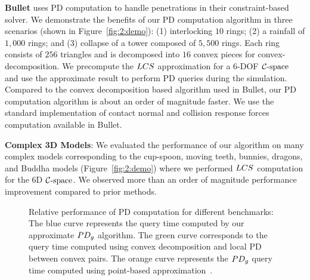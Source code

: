 \textbf{Bullet} uses PD computation to handle penetrations in their constraint-based solver.
We demonstrate the benefits of our PD computation algorithm in three scenarios (shown in Figure~\ref{fig:2:demo}):
(1) interlocking $10$ rings; (2) a rainfall of $1,000$ rings; and (3) collapse of a tower composed of $5,500$ rings.
Each ring consists of $256$ triangles and is decomposed into $16$ convex pieces for convex-decomposition.
We precompute the $LCS$ approximation for a 6-DOF $\mathcal C\text{-space}$ and use the approximate result to perform PD queries during the simulation.
Compared to the convex decomposition based algorithm used in Bullet, our PD computation algorithm is about
an order of magnitude faster. We use the standard implementation of contact normal and collision response forces computation available in Bullet.

\textbf{Complex 3D Models}:
We evaluated the performance of our algorithm on many complex models corresponding to the cup-spoon, moving teeth, bunnies, dragons, and Buddha models (Figure~\ref{fig:2:demo}) where we performed $LCS$ computation for the 6D $\mathcal C\text{-space}$. We observed more than an order of magnitude performance improvement compared to prior methods.


\begin{figure}[!h]
  \centering
    \hspace{0.05em}
  \caption[Relative performance of PD computation for different benchmarks]{Relative performance of PD computation for different benchmarks: The blue curve represents the query time computed by our approximate $PD_g$ algorithm. The green curve corresponds to the query time computed using convex decomposition and local PD between convex pairs. The orange curve represents the $PD_g$ query time computed using point-based approximation~\protect\cite{Lien:2009:ASM}.}\label{fig:2:performancecomparison}
\end{figure}



